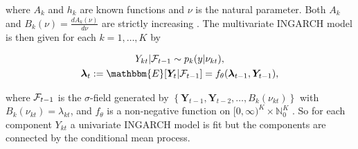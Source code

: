 where $A_k$ and $h_k$ are known functions and $\nu$ is the natural parameter. Both $A_k$ and $B_k(\nu) = \frac{d A_k(\nu)}{d \nu}$ are strictly increasing \cite{Lee:2023}. The multivariate INGARCH model is then given for each $k=1,\ldots,K$ by

\begin{gather}
Y_{kt} | \SigA_{t-1} \sim p_k(y|\nu_{kt}), \\
\bm{\lambda}_t := \mathbbm{E}[\bm{Y}_t | \SigA_{t-1}] = f_{\theta}(\bm{\lambda}_{t-1},\bm{Y}_{t-1}),
\label{eq:Mingarch 2}
\end{gather}

where $\mathcal{F}_{t-1}$ is the $\sigma$-field generated by $\left\{\bm{Y}_{t-1},\bm{Y}_{t-2},\ldots,B_k(\nu_{kt})\right\}$ with $B_k(\nu_{kt})=\lambda_{kt}$, and $f_{\theta}$ is a non-negative function on $[0,\infty)^K \times \mathbb{N}_0^K$ \cite{Lee:2023}. So for each component $Y_{kt}$ a univariate INGARCH model is fit but the components are connected by the conditional mean process. 

